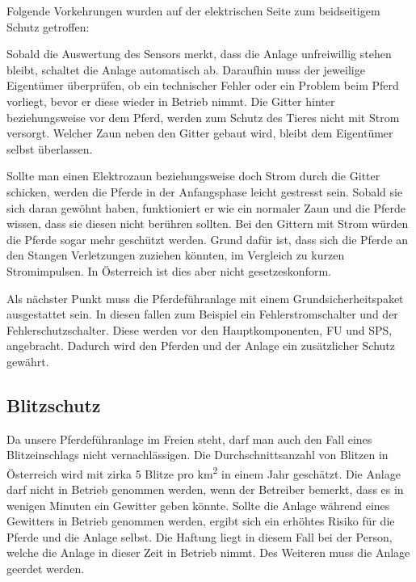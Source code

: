 Folgende Vorkehrungen wurden auf der elektrischen Seite zum beidseitigem Schutz getroffen: \newline{}

Sobald die Auswertung des Sensors merkt, dass die Anlage unfreiwillig stehen bleibt, schaltet die Anlage automatisch ab. Daraufhin muss der jeweilige Eigentümer überprüfen, ob ein technischer Fehler oder ein Problem beim Pferd vorliegt, bevor er diese wieder in Betrieb nimmt.
Die Gitter hinter beziehungsweise vor dem Pferd, werden zum Schutz des Tieres nicht mit Strom versorgt.
Welcher Zaun neben den Gitter gebaut wird, bleibt dem Eigentümer selbst überlassen.

Sollte man einen Elektrozaun beziehungsweise doch Strom durch die Gitter schicken, werden die Pferde in der Anfangsphase leicht gestresst sein. Sobald sie sich daran gewöhnt haben, funktioniert er wie ein normaler Zaun und die Pferde wissen, dass sie diesen nicht berühren sollten.
Bei den Gittern mit Strom würden die Pferde sogar mehr geschützt werden. Grund dafür ist, dass sich die Pferde an den Stangen Verletzungen zuziehen könnten, im Vergleich zu kurzen Stromimpulsen. \cite{stress} In Österreich ist dies aber nicht gesetzeskonform. \newline{}

Als nächster Punkt muss die Pferdeführanlage mit einem Grundsicherheitspaket ausgestattet sein. In diesen fallen zum Beispiel ein Fehlerstromschalter und der Fehlerschutzschalter. Diese werden vor den Hauptkomponenten, \acl{FU} und \acl{SPS}, angebracht. Dadurch wird den Pferden und der Anlage ein zusätzlicher Schutz gewährt. 

\subsection{Blitzschutz}
\label{sec:blitzschutz}

Da unsere Pferdeführanlage im Freien steht, darf man auch den Fall eines Blitzeinschlags nicht vernachlässigen. 
Die Durchschnittsanzahl von Blitzen in Österreich wird mit zirka 5 Blitze pro km\textsuperscript{2} in einem Jahr geschätzt. \cite{blitze}
Die Anlage darf nicht in Betrieb genommen werden, wenn der Betreiber bemerkt, 
dass es in wenigen Minuten ein Gewitter geben könnte.
Sollte die Anlage während eines Gewitters in Betrieb genommen werden, 
ergibt sich ein erhöhtes Risiko für die Pferde und die Anlage selbst.
Die Haftung liegt in diesem Fall bei der Person, welche die Anlage in dieser Zeit in Betrieb nimmt.
Des Weiteren muss die Anlage geerdet werden. 

